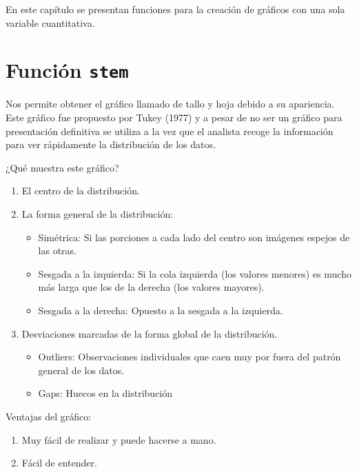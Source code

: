 \documentclass[10pt,]{krantz}
\providecommand{\tightlist}{%
  \setlength{\itemsep}{0pt}\setlength{\parskip}{0pt}}
\begin{document}
En este capítulo se presentan funciones para la creación de gráficos con
una sola variable cuantitativa.

\section{\texorpdfstring{Función \texttt{stem} 
}{Función stem  }}\label{funcion-stem}

Nos permite obtener el gráfico llamado de tallo y hoja debido a su
apariencia. Este gráfico fue propuesto por Tukey (1977) y a pesar de no
ser un gráfico para presentación definitiva se utiliza a la vez que el
analista recoge la información para ver rápidamente la distribución de
los datos.

¿Qué muestra este gráfico?

\begin{enumerate}
\def\labelenumi{\arabic{enumi}.}
\tightlist
\item
  El centro de la distribución.
\item
  La forma general de la distribución:

  \begin{itemize}
  \tightlist
  \item
    Simétrica: Si las porciones a cada lado del centro son imágenes
    espejos de las otras.
  \item
    Sesgada a la izquierda: Si la cola izquierda (los valores menores)
    es mucho más larga que los de la derecha (los valores mayores).
  \item
    Sesgada a la derecha: Opuesto a la sesgada a la izquierda.
  \end{itemize}
\item
  Desviaciones marcadas de la forma global de la distribución.

  \begin{itemize}
  \tightlist
  \item
    Outliers: Observaciones individuales que caen muy por fuera del
    patrón general de los datos.
  \item
    Gaps: Huecos en la distribución
  \end{itemize}
\end{enumerate}

Ventajas del gráfico:

\begin{enumerate}
\def\labelenumi{\arabic{enumi}.}
\tightlist
\item
  Muy fácil de realizar y puede hacerse a mano.
\item
  Fácil de entender.
\end{enumerate}
\end{document}
